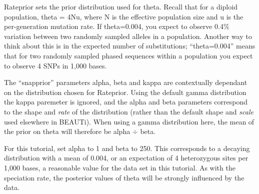 {    Rateprior sets the prior distribution used for theta. Recall that for a
    diploid population, theta = 4Nu, where N is the effective population size
    and u is the per-generation mutation rate. If theta=0.004, you expect to
    observe 0.4\% variation between two randomly sampled alleles in a
    population. Another way to think about this is in the expected number of
    substitutions; ``theta=0.004'' means that for two randomly sampled
    phased sequences within a population you expect to observe 4 SNPs in 1,000
    bases.

    The ``snapprior'' parameters alpha, beta and kappa are contextually
    dependant on the distribution chosen for Rateprior. Using the default
    gamma distribution the kappa paremeter is
    ignored, and the alpha and beta parameters correspond to the shape
    and \textit{rate} of the distribution (rather than the default shape and
    \textit{scale} used elsewhere in BEAUTi). When using a gamma distribution
    here, the mean of the prior on theta will therefore be alpha $\div$ beta.

    For this tutorial, set alpha to 1 and beta to 250. This corresponds to
    a decaying distribution with a mean of 0.004, or an expectation of 4 heterozygous sites per 1,000 bases, a
    reasonable value for the data set in this tutorial. As with the speciation
    rate, the posterior values of theta will be strongly influenced by the data.
}

